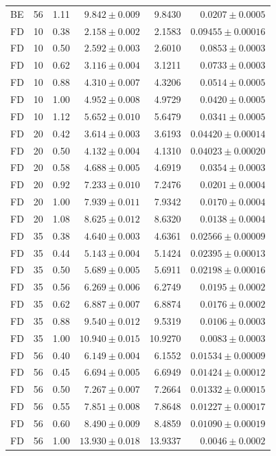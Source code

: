 \begin{tabular}{lrrrrr}
BE & 56 & 1.11 & $9.842 \pm 0.009$ & 9.8430 & $0.0207 \pm 0.0005$ \\
FD & 10 & 0.38 & $2.158 \pm 0.002$ & 2.1583 & $0.09455 \pm 0.00016$ \\
FD & 10 & 0.50 & $2.592 \pm 0.003$ & 2.6010 & $0.0853 \pm 0.0003$ \\
FD & 10 & 0.62 & $3.116 \pm 0.004$ & 3.1211 & $0.0733 \pm 0.0003$ \\
FD & 10 & 0.88 & $4.310 \pm 0.007$ & 4.3206 & $0.0514 \pm 0.0005$ \\
FD & 10 & 1.00 & $4.952 \pm 0.008$ & 4.9729 & $0.0420 \pm 0.0005$ \\
FD & 10 & 1.12 & $5.652 \pm 0.010$ & 5.6479 & $0.0341 \pm 0.0005$ \\
FD & 20 & 0.42 & $3.614 \pm 0.003$ & 3.6193 & $0.04420 \pm 0.00014$ \\
FD & 20 & 0.50 & $4.132 \pm 0.004$ & 4.1310 & $0.04023 \pm 0.00020$ \\
FD & 20 & 0.58 & $4.688 \pm 0.005$ & 4.6919 & $0.0354 \pm 0.0003$ \\
FD & 20 & 0.92 & $7.233 \pm 0.010$ & 7.2476 & $0.0201 \pm 0.0004$ \\
FD & 20 & 1.00 & $7.939 \pm 0.011$ & 7.9342 & $0.0170 \pm 0.0004$ \\
FD & 20 & 1.08 & $8.625 \pm 0.012$ & 8.6320 & $0.0138 \pm 0.0004$ \\
FD & 35 & 0.38 & $4.640 \pm 0.003$ & 4.6361 & $0.02566 \pm 0.00009$ \\
FD & 35 & 0.44 & $5.143 \pm 0.004$ & 5.1424 & $0.02395 \pm 0.00013$ \\
FD & 35 & 0.50 & $5.689 \pm 0.005$ & 5.6911 & $0.02198 \pm 0.00016$ \\
FD & 35 & 0.56 & $6.269 \pm 0.006$ & 6.2749 & $0.0195 \pm 0.0002$ \\
FD & 35 & 0.62 & $6.887 \pm 0.007$ & 6.8874 & $0.0176 \pm 0.0002$ \\
FD & 35 & 0.88 & $9.540 \pm 0.012$ & 9.5319 & $0.0106 \pm 0.0003$ \\
FD & 35 & 1.00 & $10.940 \pm 0.015$ & 10.9270 & $0.0083 \pm 0.0003$ \\
FD & 56 & 0.40 & $6.149 \pm 0.004$ & 6.1552 & $0.01534 \pm 0.00009$ \\
FD & 56 & 0.45 & $6.694 \pm 0.005$ & 6.6949 & $0.01424 \pm 0.00012$ \\
FD & 56 & 0.50 & $7.267 \pm 0.007$ & 7.2664 & $0.01332 \pm 0.00015$ \\
FD & 56 & 0.55 & $7.851 \pm 0.008$ & 7.8648 & $0.01227 \pm 0.00017$ \\
FD & 56 & 0.60 & $8.490 \pm 0.009$ & 8.4859 & $0.01090 \pm 0.00019$ \\
FD & 56 & 1.00 & $13.930 \pm 0.018$ & 13.9337 & $0.0046 \pm 0.0002$ \\
\hline
\end{tabular}